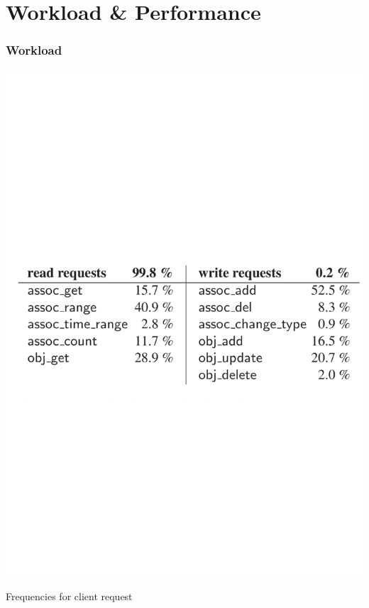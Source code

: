 \section{Workload \& Performance}
\begin{frame}[c]\frametitle{Workload}
\centering
\includegraphics[width=\textwidth]{figs/table3.pdf} 

Frequencies for client request



\end{frame}

